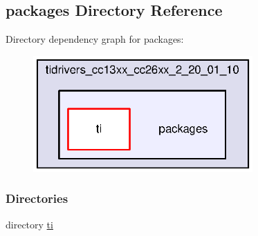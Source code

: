 \subsection{packages Directory Reference}
\label{dir_f390b8b0184fdc524e4e5d621b62d714}
Directory dependency graph for packages\+:
\nopagebreak
\begin{figure}[H]
\begin{center}
\leavevmode
\includegraphics[width=238pt]{dir_f390b8b0184fdc524e4e5d621b62d714_dep}
\end{center}
\end{figure}
\subsubsection*{Directories}
\begin{DoxyCompactItemize}
\item 
directory \hyperlink{dir_864ca02d2e1410d85cc28f968739c88b}{ti}
\end{DoxyCompactItemize}

